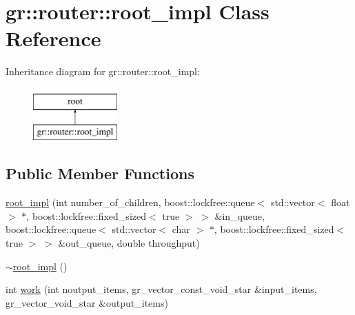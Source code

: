 \hypertarget{classgr_1_1router_1_1root__impl}{\section{gr\+:\+:router\+:\+:root\+\_\+impl Class Reference}
\label{classgr_1_1router_1_1root__impl}
}
Inheritance diagram for gr\+:\+:router\+:\+:root\+\_\+impl\+:\begin{figure}[H]
\begin{center}
\leavevmode
\includegraphics[height=2.000000cm]{classgr_1_1router_1_1root__impl}
\end{center}
\end{figure}
\subsection*{Public Member Functions}
\begin{DoxyCompactItemize}
\item 
\hyperlink{classgr_1_1router_1_1root__impl_ac848c67a6f8ca398d7ff7311ab4bb91d}{root\+\_\+impl} (int number\+\_\+of\+\_\+children, boost\+::lockfree\+::queue$<$ std\+::vector$<$ float $>$ $\ast$, boost\+::lockfree\+::fixed\+\_\+sized$<$ true $>$ $>$ \&in\+\_\+queue, boost\+::lockfree\+::queue$<$ std\+::vector$<$ char $>$ $\ast$, boost\+::lockfree\+::fixed\+\_\+sized$<$ true $>$ $>$ \&out\+\_\+queue, double throughput)
\item 
\hyperlink{classgr_1_1router_1_1root__impl_aba5b7eb8c530a435c1c2590cdd614ebc}{$\sim$root\+\_\+impl} ()
\item 
int \hyperlink{classgr_1_1router_1_1root__impl_ad2ac4750d299fecd92dd270f082ea189}{work} (int noutput\+\_\+items, gr\+\_\+vector\+\_\+const\+\_\+void\+\_\+star \&input\+\_\+items, gr\+\_\+vector\+\_\+void\+\_\+star \&output\+\_\+items)
\end{DoxyCompactItemize}


